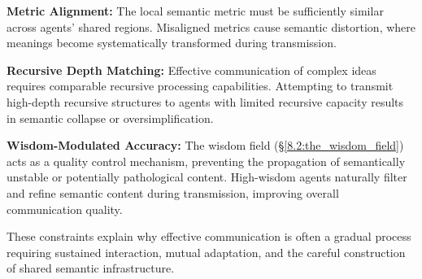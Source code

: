 \textbf{Metric Alignment:} The local semantic metric must be sufficiently similar across agents' shared regions. Misaligned metrics cause semantic distortion, where meanings become systematically transformed during transmission.

\textbf{Recursive Depth Matching:} Effective communication of complex ideas requires comparable recursive processing capabilities. Attempting to transmit high-depth recursive structures to agents with limited recursive capacity results in semantic collapse or oversimplification.

\textbf{Wisdom-Modulated Accuracy:} The wisdom field (\S\ref{8.2:the_wisdom_field}) acts as a quality control mechanism, preventing the propagation of semantically unstable or potentially pathological content. High-wisdom agents naturally filter and refine semantic content during transmission, improving overall communication quality.

These constraints explain why effective communication is often a gradual process requiring sustained interaction, mutual adaptation, and the careful construction of shared semantic infrastructure. 